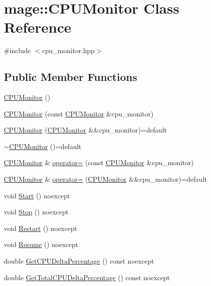 \hypertarget{classmage_1_1_c_p_u_monitor}{}\section{mage\+:\+:C\+P\+U\+Monitor Class Reference}
\label{classmage_1_1_c_p_u_monitor}


{\ttfamily \#include $<$cpu\+\_\+monitor.\+hpp$>$}

\subsection*{Public Member Functions}
\begin{DoxyCompactItemize}
\item 
\hyperlink{classmage_1_1_c_p_u_monitor_a06f9aa6e78b6659617345784f874dec6}{C\+P\+U\+Monitor} ()
\item 
\hyperlink{classmage_1_1_c_p_u_monitor_a381bdfa95b34c591c6fbdb184e889f88}{C\+P\+U\+Monitor} (const \hyperlink{classmage_1_1_c_p_u_monitor}{C\+P\+U\+Monitor} \&cpu\+\_\+monitor)
\item 
\hyperlink{classmage_1_1_c_p_u_monitor_ae2002af06ed2928e41c97e401077ae16}{C\+P\+U\+Monitor} (\hyperlink{classmage_1_1_c_p_u_monitor}{C\+P\+U\+Monitor} \&\&cpu\+\_\+monitor)=default
\item 
\hyperlink{classmage_1_1_c_p_u_monitor_a597ea4b27675a22d3d66a1d817b26652}{$\sim$\+C\+P\+U\+Monitor} ()=default
\item 
\hyperlink{classmage_1_1_c_p_u_monitor}{C\+P\+U\+Monitor} \& \hyperlink{classmage_1_1_c_p_u_monitor_a6009df0994652d011a78d1f12013e599}{operator=} (const \hyperlink{classmage_1_1_c_p_u_monitor}{C\+P\+U\+Monitor} \&cpu\+\_\+monitor)
\item 
\hyperlink{classmage_1_1_c_p_u_monitor}{C\+P\+U\+Monitor} \& \hyperlink{classmage_1_1_c_p_u_monitor_ad931f354e4191429937cb2c3e44290f1}{operator=} (\hyperlink{classmage_1_1_c_p_u_monitor}{C\+P\+U\+Monitor} \&\&cpu\+\_\+monitor)=default
\item 
void \hyperlink{classmage_1_1_c_p_u_monitor_a3f88acbb979f47309fd46f1b507fed09}{Start} () noexcept
\item 
void \hyperlink{classmage_1_1_c_p_u_monitor_a133aaed1df0e84486a6fc748d66615bb}{Stop} () noexcept
\item 
void \hyperlink{classmage_1_1_c_p_u_monitor_ab8b04a64545df631be0f40a54cc49e03}{Restart} () noexcept
\item 
void \hyperlink{classmage_1_1_c_p_u_monitor_a5fd594262dc1073da564955c58851760}{Resume} () noexcept
\item 
double \hyperlink{classmage_1_1_c_p_u_monitor_ad8d7fb2aac9a2b9b8b25b8f3ef8c1eac}{Get\+C\+P\+U\+Delta\+Percentage} () const noexcept
\item 
double \hyperlink{classmage_1_1_c_p_u_monitor_a2bf9e44d0b1114c53a031ba66c2a93bf}{Get\+Total\+C\+P\+U\+Delta\+Percentage} () const noexcept
\end{DoxyCompactItemize}
